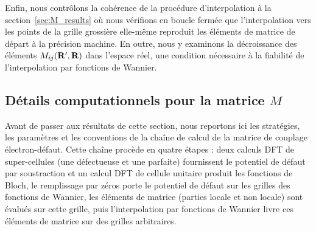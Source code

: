 Enfin, nous contrôlons la cohérence de la procédure d'interpolation à la section~\ref{sec:M_results} où nous vérifions en boucle fermée que l'interpolation vers les points de la grille grossière elle-même reproduit les éléments de matrice de départ à la précision machine. En outre, nous y examinons la décroissance des éléments $M_{ij}(\mathbf{R}',\mathbf{R})$ dans l'espace réel, une condition nécessaire à la fiabilité de l'interpolation par fonctions de Wannier.

\subsection{Détails computationnels pour la matrice $M$}\label{sec:M_détails}

Avant de passer aux résultats de cette section, nous reportons ici les stratégies, les paramètres et les conventions de la chaîne de calcul de la matrice de couplage électron-défaut. Cette chaîne procède en quatre étapes : deux calculs DFT de super-cellules (une défectueuse et une parfaite) fournissent le potentiel de défaut par soustraction et un calcul DFT de cellule unitaire produit les fonctions de Bloch, le remplissage par zéros porte le potentiel de défaut sur les grilles des fonctions de Wannier, les éléments de matrice (parties locale et non locale) sont évalués sur cette grille, puis l'interpolation par fonctions de Wannier livre ces éléments de matrice sur des grilles arbitraires.


